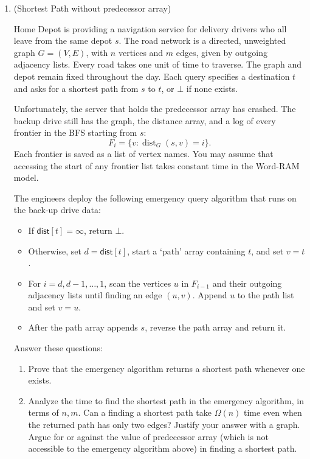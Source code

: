 \documentclass[11pt]{article}
\begin{document}
\begin{enumerate}
\item (Shortest Path without predecessor array)

Home Depot is providing a navigation service for delivery drivers who all leave from the same depot $s$. The road network is a directed, unweighted graph $G=(V,E)$, with \(n\) vertices and \(m\) edges, given by outgoing adjacency lists. Every road takes one unit of time to traverse. The graph and depot remain fixed throughout the day. Each query specifies a destination \(t\) and asks for a shortest path from \(s\) to \(t\), or \(\bot\) if none exists.

Unfortunately, the server that holds the predecessor array has crashed. The backup drive still has the graph, the distance array, and a log of every frontier in the BFS starting from $s$:
\[
F_i=\{v:\operatorname{dist}_G(s,v)=i\}.
\]
Each frontier is saved as a list of vertex names. You may assume that accessing the start of any frontier list takes constant time in the Word-RAM model.

The engineers deploy the following emergency query algorithm that runs on the back-up drive data:

\begin{itemize}
\item If \(\mathsf{dist}[t]=\infty\), return \(\bot\).
\item Otherwise, set \(d=\mathsf{dist}[t]\), start a `path' array containing \(t\), and set \(v=t\).
\item For \(i=d,d-1,\ldots,1\), scan the vertices \(u\) in \(F_{i-1}\) and their outgoing adjacency lists until finding an edge \((u,v)\). Append \(u\) to the path list and set \(v=u\).
\item After the path array appends $s$, reverse the path array and return it.
\end{itemize}

Answer these questions:

\begin{enumerate}
\item Prove that the emergency algorithm returns a shortest path whenever one exists. 

\item Analyze the time to find the shortest path in the emergency algorithm, in terms of $n,m$. Can a finding a shortest path take $\Omega(n)$ time even when the returned path has only two edges? Justify your answer with a graph. Argue for or against the value of predecessor array (which is not accessible to the emergency algorithm above) in finding a shortest path. 
\end{enumerate}


\end{enumerate}
\end{document}
